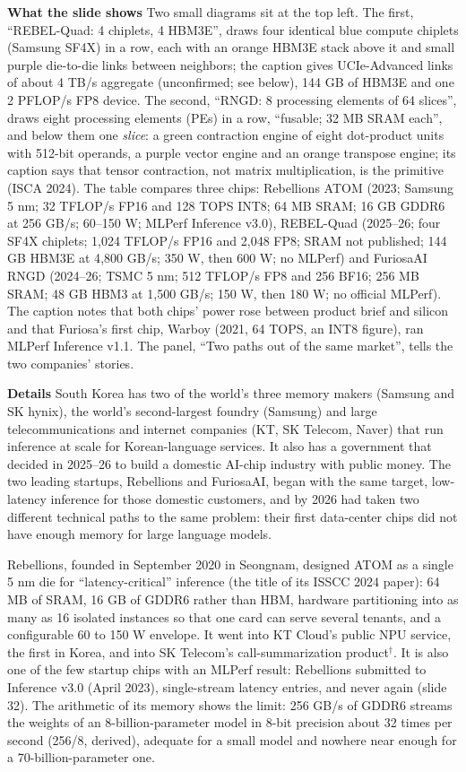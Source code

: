 \documentclass[11pt,letterpaper]{article}
\newcommand{\para}[1]{\medskip\noindent\textbf{#1}\quad}
\begin{document}
\para{What the slide shows} Two small diagrams sit at the top left. The first, ``REBEL-Quad: 4 chiplets, 4 HBM3E'', draws four identical blue compute chiplets (Samsung SF4X) in a row, each with an orange HBM3E stack above it and small purple die-to-die links between neighbors; the caption gives UCIe-Advanced links of about 4 TB/s aggregate (unconfirmed; see below), 144 GB of HBM3E and one 2 PFLOP/s FP8 device. The second, ``RNGD: 8 processing elements of 64 slices'', draws eight processing elements (PEs) in a row, ``fusable; 32 MB SRAM each'', and below them one \emph{slice}: a green contraction engine of eight dot-product units with 512-bit operands, a purple vector engine and an orange transpose engine; its caption says that tensor contraction, not matrix multiplication, is the primitive (ISCA 2024). The table compares three chips: Rebellions ATOM (2023; Samsung 5 nm; 32 TFLOP/s FP16 and 128 TOPS INT8; 64 MB SRAM; 16 GB GDDR6 at 256 GB/s; 60--150 W; MLPerf Inference v3.0), REBEL-Quad (2025--26; four SF4X chiplets; 1{,}024 TFLOP/s FP16 and 2{,}048 FP8; SRAM not published; 144 GB HBM3E at 4{,}800 GB/s; 350 W, then 600 W; no MLPerf) and FuriosaAI RNGD (2024--26; TSMC 5 nm; 512 TFLOP/s FP8 and 256 BF16; 256 MB SRAM; 48 GB HBM3 at 1{,}500 GB/s; 150 W, then 180 W; no official MLPerf). The caption notes that both chips' power rose between product brief and silicon and that Furiosa's first chip, Warboy (2021, 64 TOPS, an INT8 figure), ran MLPerf Inference v1.1. The panel, ``Two paths out of the same market'', tells the two companies' stories.

\para{Details} South Korea has two of the world's three memory makers (Samsung and SK hynix), the world's second-largest foundry (Samsung) and large telecommunications and internet companies (KT, SK Telecom, Naver) that run inference at scale for Korean-language services. It also has a government that decided in 2025--26 to build a domestic AI-chip industry with public money. The two leading startups, Rebellions and FuriosaAI, began with the same target, low-latency inference for those domestic customers, and by 2026 had taken two different technical paths to the same problem: their first data-center chips did not have enough memory for large language models.

Rebellions, founded in September 2020 in Seongnam, designed ATOM as a single 5 nm die for ``latency-critical'' inference (the title of its ISSCC 2024 paper): 64 MB of SRAM, 16 GB of GDDR6 rather than HBM, hardware partitioning into as many as 16 isolated instances so that one card can serve several tenants, and a configurable 60 to 150 W envelope. It went into KT Cloud's public NPU service, the first in Korea, and into SK Telecom's call-summarization product$^\dagger$. It is also one of the few startup chips with an MLPerf result: Rebellions submitted to Inference v3.0 (April 2023), single-stream latency entries, and never again (slide 32). The arithmetic of its memory shows the limit: 256 GB/s of GDDR6 streams the weights of an 8-billion-parameter model in 8-bit precision about 32 times per second (256/8, derived), adequate for a small model and nowhere near enough for a 70-billion-parameter one.
\end{document}
